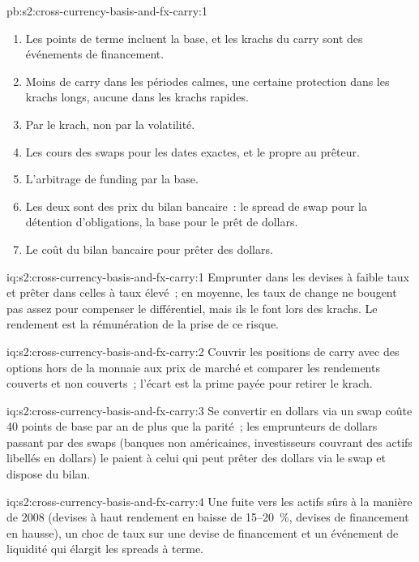 \begin{solution}{pb:s2:cross-currency-basis-and-fx-carry:1}
\begin{enumerate}
à hauteur de 40~\% de son rendement~; le basis trade rapporte 42.5 points de base par an pendant les prêts sur les fenêtres de fin de trimestre, 6.7 par an en tout.
\item Les points de terme incluent la base, et les krachs du carry sont des événements de financement.
\item Moins de carry dans les périodes calmes, une certaine protection dans les krachs longs, aucune dans les krachs rapides.
\item Par le krach, non par la volatilité.
\item Les cours des swaps pour les dates exactes, et le  propre au prêteur.
\item L'arbitrage de funding par la base.
\item Les deux sont des prix du bilan bancaire~: le spread de swap pour la détention d'obligations, la base pour le prêt de dollars.
\item Le coût du bilan bancaire pour prêter des dollars.
\end{enumerate}
\end{solution}

\begin{solution}{iq:s2:cross-currency-basis-and-fx-carry:1}
Emprunter dans les devises à faible taux et prêter dans celles à taux élevé~; en moyenne, les taux de change ne bougent pas assez pour compenser le différentiel, mais ils le font lors des
krachs. Le rendement est la rémunération de la prise de ce risque.
\end{solution}

\begin{solution}{iq:s2:cross-currency-basis-and-fx-carry:2}
Couvrir les positions de carry avec des options hors de la monnaie aux prix de marché et comparer les rendements couverts et non couverts~; l'écart est la prime payée
pour retirer le krach.
\end{solution}

\begin{solution}{iq:s2:cross-currency-basis-and-fx-carry:3}
Se convertir en dollars via un swap coûte 40 points de base par an de plus que la parité~; les emprunteurs de dollars passant par des swaps (banques non américaines, investisseurs couvrant
des actifs libellés en dollars) le paient à celui qui peut prêter des dollars via le swap et dispose du bilan.
\end{solution}

\begin{solution}{iq:s2:cross-currency-basis-and-fx-carry:4}
Une fuite vers les actifs sûrs à la manière de 2008 (devises à haut rendement en baisse de 15--20~\%, devises de financement en hausse), un choc de taux sur une devise de financement et un événement de liquidité qui
élargit les spreads à terme.
\end{solution}

